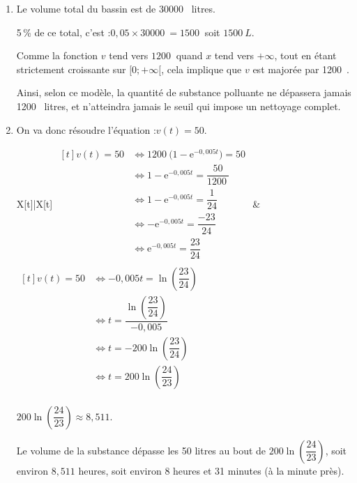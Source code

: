 \documentclass[10pt]{article}
\providecommand{\e}{{\mathrm{e}}}
\providecommand{\np}[2][]{{#2~#1}}
\begin{document}
\begin{enumerate}
\begin{enumerate}
		\item La fonction $v$ est dérivable sur $[0 ; +\infty[$.

		$\forall x \in [0 ; +\infty[,\quad v'(x) = 1200 \times \big(0 - (-0,005)\e^{-0,005t}\big) = 6\e^{-0,005t}$.

		Comme 6 est strictement positif et que la fonction exponentielle est à valeurs strictement positives, on en déduit que la fonction dérivée $v'$ est à valeurs strictement positives sur $[0 ; +\infty[$, et donc que la fonction $v$ est strictement croissante sur cet intervalle.
	\end{enumerate}

	\item Le volume total du bassin est de \np{30000} litres.

	5\,\% de ce total, c'est :\quad $0,05\times \np{30000} = \np{1500}$ soit  $\np[L]{1500}$.

	Comme la fonction $v$ tend vers $\np{1200}$ quand $x$ tend vers $+\infty$, tout en étant strictement croissante sur $[0 ; +\infty[$, cela implique que $v$ est majorée par \np{1200}.

	Ainsi, selon ce modèle, la quantité de substance polluante ne dépassera jamais \np{1200} litres, et n'atteindra jamais le seuil qui impose un nettoyage complet.

	\item On va donc résoudre l'équation :\quad $v(t) = 50$.

	\begin{tblr}{X[t]|X[t]}
		$\begin{aligned}[t]
		v(t) = 50
		&\iff \np{1200}\big(1 - \e^{-0,005t}\big)	= 50\\
		&\iff 1 - \e^{-0,005t}	= \dfrac{50}{\np{1200}}\\
		&\iff 1 - \e^{-0,005t}	= \dfrac{1}{24}\\
		&\iff - \e^{-0,005t}	= \dfrac{-23}{24}\\
		&\iff \e^{-0,005t}	= \dfrac{23}{24}\\
	\end{aligned}$
	&
	$\begin{aligned}[t]
		v(t) = 50
		&\iff -0,005t	= \ln\left(\dfrac{23}{24}\right) \\
		&\iff t	= \dfrac{\ln\left(\dfrac{23}{24}\right)}{-0,005}\\
		&\iff t = -200\ln\left(\dfrac{23}{24}\right) \\
		&\iff t = 200\ln\left(\dfrac{24}{23}\right)\\
	\end{aligned}$
	\end{tblr}

	$200\ln\left(\dfrac{24}{23}\right)\approx 8,511$.

	Le volume de la substance dépasse les 50 litres au bout de $200\ln\left(\dfrac{24}{23}\right)$, soit environ $8,511$ heures, soit environ 8 heures et 31 minutes (à la minute près).
\end{enumerate}
\end{document}
